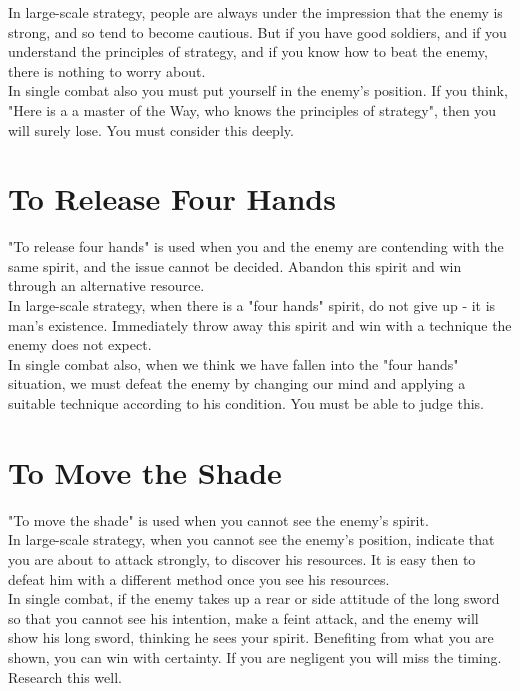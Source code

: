 In large-scale strategy, people are always under the impression that the enemy is strong, and so tend to become cautious. But if you have good soldiers, and if you understand the principles of strategy, and if you know how to beat the enemy, there is nothing to worry about.\\

In single combat also you must put yourself in the enemy's position. If you think, "Here is a a master of the Way, who knows the principles of strategy", then you will surely lose. You must consider this deeply.\\
\section{To Release Four Hands}

"To release four hands" is used when you and the enemy are contending with the same spirit, and the issue cannot be decided. Abandon this spirit and win through an alternative resource.\\

In large-scale strategy, when there is a "four hands" spirit, do not give up - it is man's existence. Immediately throw away this spirit and win with a technique the enemy does not expect.\\

In single combat also, when we think we have fallen into the "four hands" situation, we must defeat the enemy by changing our mind and applying a suitable technique according to his condition. You must be able to judge this.\\
\section{To Move the Shade}

"To move the shade" is used when you cannot see the enemy's spirit.\\

In large-scale strategy, when you cannot see the enemy's position, indicate that you are about to attack strongly, to discover his resources. It is easy then to defeat him with a different method once you see his resources.\\

In single combat, if the enemy takes up a rear or side attitude of the long sword so that you cannot see his intention, make a feint attack, and the enemy will show his long sword, thinking he sees your spirit. Benefiting from what you are shown, you can win with certainty. If you are negligent you will miss the timing. Research this well.\\
